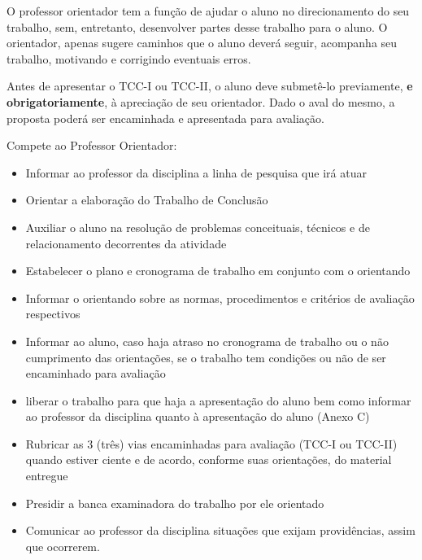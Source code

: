 O professor orientador tem a função de ajudar o aluno no direcionamento do seu trabalho, sem, entretanto, desenvolver partes desse 
trabalho para o aluno. O orientador, apenas sugere caminhos que o aluno deverá seguir, acompanha seu trabalho, motivando e corrigindo eventuais erros.

Antes de apresentar o TCC-I ou TCC-II, o aluno deve submetê-lo previamente, \textbf{e obrigatoriamente}, à apreciação de seu orientador. 
Dado o aval do mesmo, a proposta poderá ser encaminhada e apresentada para avaliação.

Compete ao Professor Orientador:

	\begin{itemize}
		\item Informar ao professor da disciplina a linha de pesquisa que irá atuar
	
		\item Orientar a elaboração do Trabalho de Conclusão
	
		\item Auxiliar o aluno na resolução de problemas conceituais, técnicos e de relacionamento decorrentes da atividade
	
		\item Estabelecer o plano e cronograma de trabalho em conjunto com o orientando
	
		\item Informar o orientando sobre as normas, procedimentos e critérios de avaliação respectivos
	
		\item Informar ao aluno, caso haja atraso no cronograma de trabalho ou o não cumprimento das orientações, se o trabalho tem condições ou não de ser 
		encaminhado para avaliação
	
		\item liberar o trabalho para que haja a apresentação do aluno bem como informar ao professor da disciplina quanto à apresentação do aluno (Anexo C)
	
		\item Rubricar as 3 (três) vias encaminhadas para avaliação (TCC-I ou TCC-II) quando estiver ciente e de acordo, 
		conforme suas orientações, do material entregue
	
		\item Presidir a banca examinadora do trabalho por ele orientado
	
		\item Comunicar ao professor da disciplina situações que exijam providências, assim que ocorrerem.
	\end{itemize}



